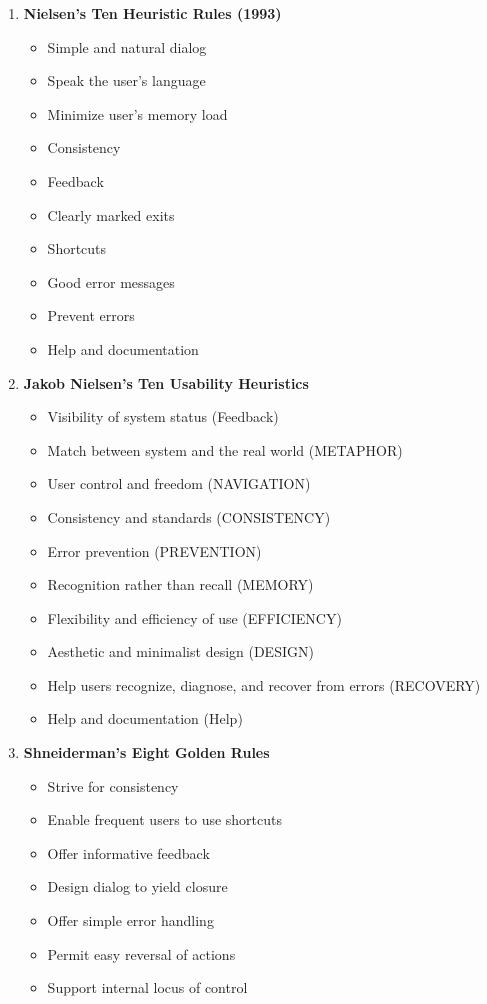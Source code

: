 \documentclass{article}
\begin{document}
\begin{enumerate}
\item{\bf Nielsen’s Ten Heuristic Rules (1993)}
\begin{itemize}
\item Simple and natural dialog
\item Speak the user’s language
\item Minimize user’s memory load
\item Consistency
\item Feedback
\item Clearly marked exits
\item Shortcuts
\item Good error messages
\item Prevent errors
\item Help and documentation
\end{itemize}
\item{\bf Jakob Nielsen’s Ten Usability Heuristics}
\begin{itemize}
  \item Visibility of system status (Feedback)
  \item Match between system and the real world (METAPHOR)
  \item User control and freedom (NAVIGATION)
  \item Consistency and standards (CONSISTENCY)
  \item Error prevention (PREVENTION)
  \item Recognition rather than recall (MEMORY)
  \item Flexibility and efficiency of use (EFFICIENCY)
  \item Aesthetic and minimalist design (DESIGN)
  \item Help users recognize, diagnose, and recover from errors (RECOVERY)
  \item Help and documentation (Help)
\end{itemize}
\item{\bf Shneiderman’s Eight Golden Rules}
\begin{itemize}
\item Strive for consistency
\item Enable frequent users to use shortcuts
\item Offer informative feedback
\item Design dialog to yield closure
\item Offer simple error handling
\item Permit easy reversal of actions
\item Support internal locus of control

\end{itemize}
\end{enumerate}
\end{document}

